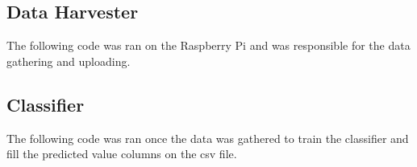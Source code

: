\documentclass[a4paper,12pt,twoside]{report}
\begin{document}
\subsection{Data Harvester}
The following code was ran on the Raspberry Pi and was responsible for the data gathering and uploading.



\subsection{Classifier}
The following code was ran once the data was gathered to train the classifier and fill the predicted value columns on the csv file.




\end{document}
